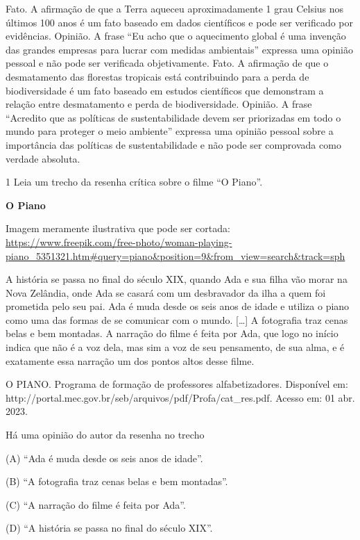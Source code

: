 \begin{itemize}
\begin{itemize}
{\begin{itemize}
\begin{itemize}

Fato. A afirmação de que a Terra aqueceu aproximadamente 1 grau Celsius
nos últimos 100 anos é um fato baseado em dados científicos e pode ser
verificado por evidências. Opinião. A frase ``Eu acho que o aquecimento
global é uma invenção das grandes empresas para lucrar com medidas
ambientais'' expressa uma opinião pessoal e não pode ser verificada
objetivamente. Fato. A afirmação de que o desmatamento das florestas
tropicais está contribuindo para a perda de biodiversidade é um fato
baseado em estudos científicos que demonstram a relação entre
desmatamento e perda de biodiversidade. Opinião. A frase ``Acredito que
as políticas de sustentabilidade devem ser priorizadas em todo o mundo
para proteger o meio ambiente'' expressa uma opinião pessoal sobre a
importância das políticas de sustentabilidade e não pode ser comprovada
como verdade absoluta.


\num{1} Leia um trecho da resenha crítica sobre o filme ``O Piano''.

\textbf{O Piano}

Imagem meramente ilustrativa que pode ser cortada:
\url{https://www.freepik.com/free-photo/woman-playing-piano_5351321.htm\#query=piano\&position=9\&from_view=search\&track=sph}

A história se passa no final do século XIX, quando Ada e sua filha vão
morar na Nova Zelândia, onde Ada se casará com um desbravador da ilha a
quem foi prometida pelo seu pai. Ada é muda desde os seis anos de idade
e utiliza o piano como uma das formas de se comunicar com o mundo.
{[}\ldots{}{]} A fotografia traz cenas belas e bem montadas. A narração
do filme é feita por Ada, que logo no início indica que não é a voz
dela, mas sim a voz de seu pensamento, de sua alma, e é exatamente essa
narração um dos pontos altos desse filme.

O PIANO. Programa de formação de professores alfabetizadores. Disponível
em: http://portal.mec.gov.br/seb/arquivos/pdf/Profa/cat\_res.pdf. Acesso
em: 01 abr. 2023.

Há uma opinião do autor da resenha no trecho

(A) ``Ada é muda desde os seis anos de idade''.

(B) ``A fotografia traz cenas belas e bem montadas''.

(C) ``A narração do filme é feita por Ada''.

(D) ``A história se passa no final do século XIX''.


\end{itemize}
\end{itemize}}
\end{itemize}
\end{itemize}
